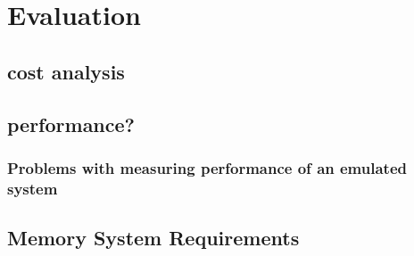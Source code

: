 \chapter{Evaluation}

\label{chap:eval}




\section{cost analysis}
\section{performance?}
\subsection{Problems with measuring performance of an emulated system}

\section{Memory System Requirements}
\cite{jacobSoftwaremanagedAddressTranslation1997}



